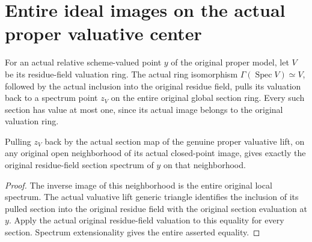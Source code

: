 \section{Entire ideal images on the actual proper valuative center}

\begin{definition}
\label{def:actual-center-top-spectrum}
\leanok
{}
For an actual relative scheme-valued point $y$ of the original proper
model, let $V$ be its residue-field valuation ring. The actual ring
isomorphism $\Gamma(\operatorname{Spec}V)\simeq V$, followed by the
actual inclusion into the original residue field, pulls its valuation
back to a spectrum point $z_V$ on the entire original global section
ring. Every such section has value at most one, since its actual
image belongs to the original valuation ring.
\end{definition}

\begin{lemma}
\label{lem:actual-center-top-spectrum-restriction}
\leanok
{}
Pulling $z_V$ back by the actual section map of the genuine proper
valuative lift, on any original open neighborhood of its actual
closed-point image, gives exactly the original residue-field section
spectrum of $y$ on that neighborhood.
\end{lemma}
\begin{proof}
The inverse image of this neighborhood is the entire original local
spectrum. The actual valuative lift generic triangle identifies the
inclusion of its pulled section into the original residue field with
the original section evaluation at $y$. Apply the actual original
residue-field valuation to this equality for every section. Spectrum
extensionality gives the entire asserted equality.
\end{proof}

